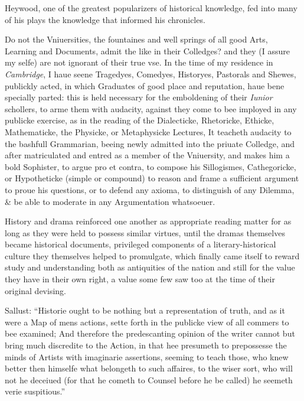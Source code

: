 Heywood, one of the greatest popularizers of historical knowledge, fed into many of his plays the knowledge that informed his chronicles. 

\begin{bq}
Do not the Vniuersities, the fountaines and well springs of all good Arts, Learning and Documents, admit the like in their Colledges? and they (I assure my selfe) are not ignorant of their true vse. In the time of my residence in \emph{Cambridge}, I haue seene Tragedyes, Comedyes, Historyes, Pastorals and Shewes, publickly acted, in which Graduates of good place and reputation, haue bene specially parted: this is held necessary for the emboldening of their \emph{Iunior} schollers, to arme them with audacity, against they come to bee imployed in any publicke exercise, as in the reading of the Dialecticke, Rhetoricke, Ethicke, Mathematicke, the Physicke, or Metaphysicke Lectures, It teacheth audacity to the bashfull Grammarian, beeing newly admitted into the priuate Colledge, and after matriculated and entred as a member of the Vniuersity, and makes him a bold Sophister, to argue pro et contra, to compose his Sillogismes, Cathegoricke, or Hypotheticke (simple or compound) to reason and frame a sufficient argument to proue his questions, or to defend any axioma, to distinguish of any Dilemma, \& be able to moderate in any Argumentation whatsoeuer.~\cite[N. pag.]{heywood_apology_1612}
\end{bq}

History and drama reinforced one another as appropriate reading matter for as long as they were held to possess similar virtues, until the dramas themselves became historical documents, privileged components of a literary-historical culture they themselves helped to promulgate, which finally came itself to reward study and understanding both as antiquities of the nation and still for the value they have in their own right, a value some few saw too at the time of their original devising.

Sallust:
``Historie ought to be nothing but a representation of truth, and as it were a Map of mens actions, sette forth in the publicke view of all commers to bee examined; And therefore the predescanting opinion of the writer cannot but bring much discredite to the Action, in that hee presumeth to prepossesse the minds of Artists with imaginarie assertions, seeming to teach those, who knew better then himselfe what belongeth to such affaires, to the wiser sort, who will not he deceiued (for that he cometh to Counsel before he be called) he seemeth verie suspitious.''~\cite[N. pag.]{heywood_choice_1608}

